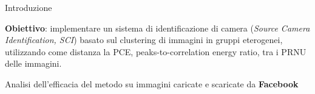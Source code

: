 
\begin{tframe}{Introduzione}

\vspace{0.5cm}

\textbf{Obiettivo}: implementare un sistema di identificazione di camera (\emph{Source Camera Identification, SCI}) basato sul clustering di immagini in gruppi eterogenei, utilizzando come distanza la PCE, peaks-to-correlation energy ratio, tra i PRNU delle immagini. 

\vspace{1cm}
Analisi dell'efficacia del metodo su immagini caricate e scaricate da \textbf{Facebook}

\end{tframe}
